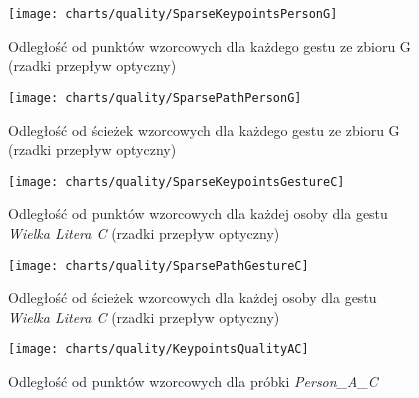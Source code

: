     \newpage
      \begin{figure}[!ht]
        \centering
        \texttt{[image: charts/quality/SparseKeypointsPersonG]}
        \caption[Odległość od punktów wzorcowych dla każdego gestu (rzadki przepływ optyczny)]
                {Odległość od punktów wzorcowych dla każdego gestu ze zbioru G\\(rzadki przepływ optyczny)}
        \label{fig:SparseKeypointsPersonG}
      \end{figure}

      \begin{figure}[!ht]
        \centering
        \texttt{[image: charts/quality/SparsePathPersonG]}
        \caption[Odległość od ścieżek wzorcowych dla każdego gestu (rzadki przepływ optyczny)]
                {Odległość od ścieżek wzorcowych dla każdego gestu ze zbioru G\\(rzadki przepływ optyczny)}
        \label{fig:SparsePathPersonG}
      \end{figure}

    \newpage
      \begin{figure}[!ht]
        \centering
        \texttt{[image: charts/quality/SparseKeypointsGestureC]}
        \caption[Odległość od punktów wzorcowych dla każdej osoby dla gestu C (rzadki przepływ optyczny)]
                {Odległość od punktów wzorcowych dla każdej osoby dla gestu\\\textit{Wielka Litera C} (rzadki przepływ optyczny)}
        \label{fig:SparseKeypointsGestureC}
      \end{figure}

      \begin{figure}[!ht]
        \centering
        \texttt{[image: charts/quality/SparsePathGestureC]}
        \caption[Odległość od ścieżek wzorcowych dla każdej osoby dla gestu C (rzadki przepływ optyczny)]
                {Odległość od ścieżek wzorcowych dla każdej osoby dla gestu\\\textit{Wielka Litera C} (rzadki przepływ optyczny)}
        \label{fig:SparsePathGestureC}
      \end{figure}

    \newpage
      \begin{figure}[!ht]
        \centering
        \texttt{[image: charts/quality/KeypointsQualityAC]}
        \caption[Odległość od punktów wzorcowych (próbka osoby A, gest C)]
                {Odległość od punktów wzorcowych dla próbki \textit{Person\_A\_C}}
        \label{fig:KeypointsQualityAC}
      \end{figure}

